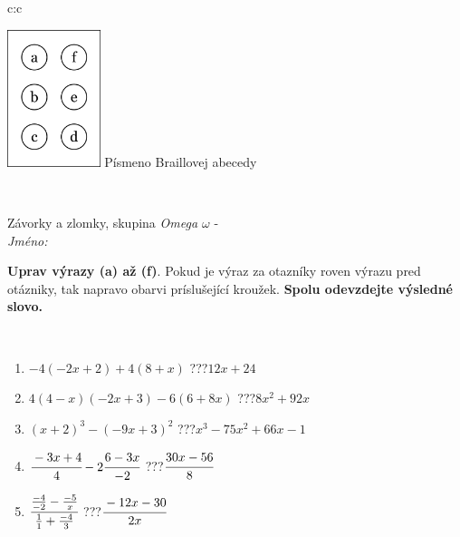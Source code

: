 \documentclass[10pt]{report}
\begin{document}
\begin{tabular}{c:c}
\begin{minipage}[c][104.5mm][t]{0.5\linewidth}
\begin{center}
\begin{minipage}{0.20\linewidth}
\begin{center}
\includegraphics[height=40mm]{../images/braille.png}
{\small Písmeno Braillovej abecedy}
\end{center}
\end{minipage}
\end{center}
\end{minipage}
\\ \hdashline
\begin{minipage}[c][104.5mm][t]{0.5\linewidth}
\begin{center}
\vspace{7mm}
{\huge Závorky a zlomky, skupina \textit{Omega $\omega$} -}\\[5mm]
\textit{Jméno:}\phantom{xxxxxxxxxxxxxxxxxxxxxxxxxxxxxxxxxxxxxxxxxxxxxxxxxxxxxxxxxxxxxxxxx}\\[5mm]
\begin{minipage}{0.95\linewidth}
\begin{center}
\textbf{Uprav výrazy (a) až (f)}. Pokud je výraz za otazníky roven výrazu pred otázniky, tak napravo obarvi príslušející kroužek. \textbf{Spolu odevzdejte výsledné slovo.}
\end{center}
\end{minipage}
\\[1mm]
\begin{minipage}{0.79\linewidth}
\begin{center}
\begin{varwidth}{\linewidth}
\begin{enumerate}
\normalsize
\item $-4(-2x+2)+4(8+x)$\quad \dotfill\; ???\;\dotfill \quad $12x+24$
\item $4(4-x)(-2x+3)-6(6+8x)$\quad \dotfill\; ???\;\dotfill \quad $8x^2+92x$
\item $(x+2)^3-(-9x+3)^2$\quad \dotfill\; ???\;\dotfill \quad $x^3-75x^2+66x-1$
\item $\cfrac{-3x+4}{4}-2\cfrac{6-3x}{-2}$\quad \dotfill\; ???\;\dotfill \quad $\cfrac{30x-56}{8}$
\item $\cfrac{\frac{-4}{-2}-\frac{-5}{x}}{\frac{1}{1}+\frac{-4}{3}}$\quad \dotfill\; ???\;\dotfill \quad $\cfrac{-12x-30}{2x}$

\end{enumerate}
\end{varwidth}
\end{center}
\end{minipage}
\end{center}
\end{minipage}
\end{tabular}
\end{document}

